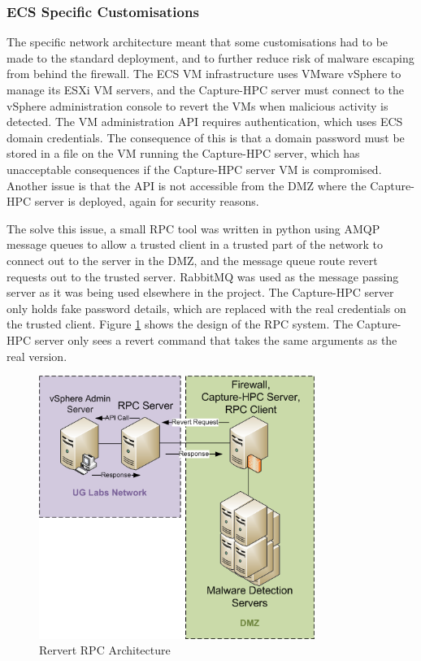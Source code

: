\subsubsection{ECS Specific Customisations}

The specific network architecture meant that some customisations had to be made
to the standard deployment, and to further reduce risk of malware escaping from
behind the firewall. The ECS VM infrastructure uses VMware vSphere to manage its
ESXi VM servers, and the Capture-HPC server must connect to the vSphere
administration console to revert the VMs when malicious activity is detected.
The VM administration API requires authentication, which uses ECS domain
credentials. The consequence of this is that a domain password must be stored in
a file on the VM running the Capture-HPC server, which has unacceptable
consequences if the Capture-HPC server VM is compromised. Another issue is that
the API is not accessible from the DMZ where the Capture-HPC server is deployed,
again for security reasons.

The solve this issue, a small RPC tool was written in python using AMQP message
 queues to
allow a trusted client in a trusted part of the network to connect out to the
server in the DMZ, and the message queue route revert requests out to the
trusted server. RabbitMQ was used as the message passing server as it was being
used elsewhere in the project. The Capture-HPC server only holds fake password details, which
are replaced with the real credentials on the trusted client. Figure
\ref{fig:revert-1} shows
the design of the RPC system. The Capture-HPC server only sees a
revert command that takes the same arguments as the real version. 

\begin{figure}[htb]
\centering
\includegraphics[width=0.8\textwidth]{img/revert-rpc.png}
\caption{Rervert RPC Architecture}
\label{fig:revert-1}
\end{figure}

